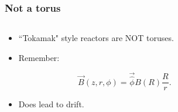 \documentclass{beamer}
\begin{document}
\begin{frame}
\frametitle{Not a torus}
\begin{columns}
\begin{column}{0.5\linewidth}
\begin{itemize}
\item<1-> ``Tokamak" style reactors are NOT toruses.

\item<2-> Remember:

\begin{equation*}
\vec{B}(z,r,\phi)=\vec{\hat{\phi}} B(R)\frac{R}{r}.
\end{equation*}

\item<3-> Does lead to drift.

\end{itemize}
\end{column}
\begin{column}{0.5\linewidth}
\end{column}
\end{columns}
\end{frame}
\end{document}
